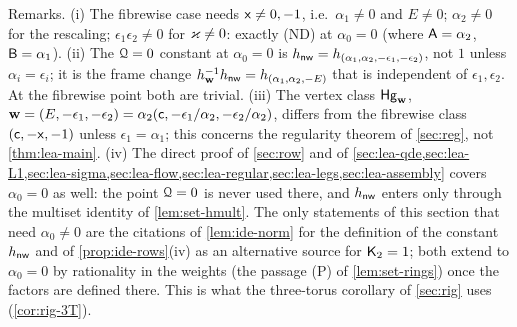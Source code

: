 Remarks. (i) The fibrewise case needs $\mathsf{x}\neq 0,-1$, i.e.\ $\alpha_1\neq 0$ and $E\neq 0$; $\alpha_2\neq 0$ for the rescaling; $\epsilon_1\epsilon_2\neq 0$ for $\varkappa\neq 0$: exactly (ND) at $\alpha_0 = 0$ (where $\mathsf{A} = \alpha_2$, $\mathsf{B} = \alpha_1$). (ii) The $\mathcal{Q} = 0$ constant at $\alpha_0 = 0$ is $h_{\mathsf{nw}} = h_{(\alpha_1,\alpha_2,-\epsilon_1,-\epsilon_2)}$, not $1$ unless $\alpha_i = \epsilon_i$; it is the frame change $h_{\mathbf{w}}^{-1}h_{\mathsf{nw}} = h_{(\alpha_1,\alpha_2,-E)}$ that is independent of $\epsilon_1,\epsilon_2$. At the fibrewise point both are trivial. (iii) The vertex class $\mathsf{Hg}_{\mathbf{w}}$, $\mathbf{w} = (E,-\epsilon_1,-\epsilon_2) = \alpha_2(\mathsf{c},-\epsilon_1/\alpha_2,-\epsilon_2/\alpha_2)$, differs from the fibrewise class $(\mathsf{c},-\mathsf{x},-1)$ unless $\epsilon_1 = \alpha_1$; this concerns the regularity theorem of \cref{sec:reg}, not \cref{thm:lea-main}. (iv) The direct proof of \cref{sec:row} and of \cref{sec:lea-qde,sec:lea-L1,sec:lea-sigma,sec:lea-flow,sec:lea-regular,sec:lea-legs,sec:lea-assembly} covers $\alpha_0 = 0$ as well: the point $\mathcal{Q} = 0$ is never used there, and $h_{\mathsf{nw}}$ enters only through the multiset identity of \cref{lem:set-hmult}. The only statements of this section that need $\alpha_0\neq 0$ are the citations of \cref{lem:ide-norm} for the definition of the constant $h_{\mathsf{nw}}$ and of \cref{prop:ide-rows}(iv) as an alternative source for $\mathsf{K}_{2} = 1$; both extend to $\alpha_0 = 0$ by rationality in the weights (the passage (P) of \cref{lem:set-rings}) once the factors are defined there. This is what the three-torus corollary of \cref{sec:rig} uses (\cref{cor:rig-3T}).

